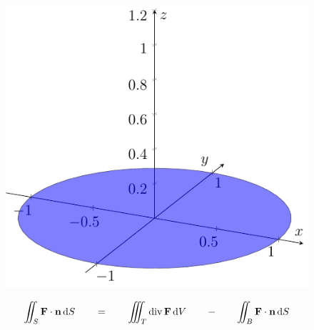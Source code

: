 \begin{frame}
\begin{figure}[ht]
\begin{minipage}[b]{0.30\linewidth}
        \end{minipage}
        \hspace{0.30cm}
        \begin{minipage}[b]{0.30\linewidth}
            \centering
            \includegraphics[width=\textwidth]{../img/2-Bunn.pdf}
        \end{minipage}
    \end{figure}
\begin{align*}
    \iint_{S} \mathbf{F} \cdot \mathbf{n} \mathop{}\! \mathrm{d} S\mathop{}\!
    \qquad =  \qquad
    \iiint_{T} \operatorname{div} \mathbf{F} \mathop{}\! \mathrm{d} V\mathop{}\!
    \qquad - \qquad
    \iint_{B} \mathbf{F} \cdot \mathbf{n} \mathop{}\! \mathrm{d} S\mathop{}\!
\end{align*}
\end{frame}


